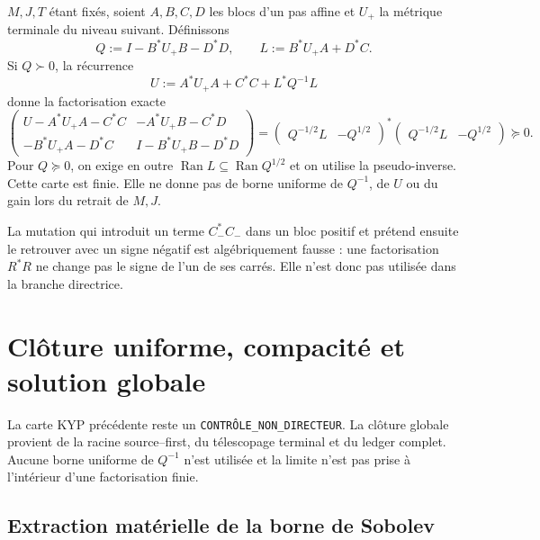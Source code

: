 $M,J,T$ étant fixés, soient $A,B,C,D$ les blocs d'un pas affine et $U_+$ la
métrique terminale du niveau suivant. Définissons
\begin{equation}\label{eq:pdf2-ns-kyp-ql}
 Q:=I-B^*U_+B-D^*D,
 \qquad L:=B^*U_+A+D^*C.
\end{equation}
Si $Q\succ0$, la récurrence
\begin{equation}\label{eq:pdf2-ns-kyp-u}
 U:=A^*U_+A+C^*C+L^*Q^{-1}L
\end{equation}
donne la factorisation exacte
\begin{equation}\label{eq:pdf2-ns-kyp-factor}
 \begin{pmatrix}
 U-A^*U_+A-C^*C&-A^*U_+B-C^*D\\
 -B^*U_+A-D^*C&I-B^*U_+B-D^*D
 \end{pmatrix}
 =
 \begin{pmatrix}Q^{-1/2}L&-Q^{1/2}\end{pmatrix}^{*}
 \begin{pmatrix}Q^{-1/2}L&-Q^{1/2}\end{pmatrix}\succeq0.
\end{equation}
Pour $Q\succeq0$, on exige en outre
$\operatorname{Ran}L\subseteq\operatorname{Ran}Q^{1/2}$ et on utilise la
pseudo-inverse. Cette carte est finie. Elle ne donne pas de borne uniforme de $Q^{-1}$, de $U$ ou
du gain lors du retrait de $M,J$.

La mutation qui introduit un terme $C_-^*C_-$ dans un bloc positif et
prétend ensuite le retrouver avec un signe négatif est algébriquement fausse : une
factorisation $R^*R$ ne change pas le signe de l'un de ses carrés. Elle n'est donc pas utilisée
dans la branche directrice.

\section{Clôture uniforme, compacité et solution globale}

La carte KYP précédente reste un \texttt{CONTRÔLE\_NON\_DIRECTEUR}. La clôture
globale provient de la racine source--first, du télescopage terminal et du ledger
complet. Aucune borne uniforme de $Q^{-1}$ n'est utilisée et la limite n'est pas prise à l'intérieur
d'une factorisation finie.

\subsection{Extraction matérielle de la borne de Sobolev}

